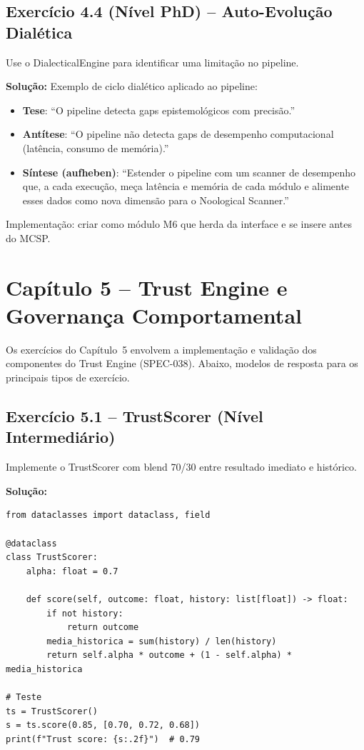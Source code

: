 \subsection*{Exercício 4.4 (Nível PhD) -- Auto-Evolução Dialética}
Use o DialecticalEngine para identificar uma limitação no pipeline.

\textbf{Solução:} Exemplo de ciclo dialético aplicado ao pipeline:

\begin{itemize}
\item \textbf{Tese}: ``O pipeline detecta gaps epistemológicos com precisão.''
\item \textbf{Antítese}: ``O pipeline não detecta gaps de desempenho
computacional (latência, consumo de memória).''
\item \textbf{Síntese (aufheben)}: ``Estender o pipeline com um scanner
de desempenho que, a cada execução, meça latência e memória de cada
módulo e alimente esses dados como nova dimensão para o Noological
Scanner.''
\end{itemize}

Implementação: criar  como módulo M6 que
herda da interface  e se insere antes do MCSP.

\section*{Capítulo 5 -- Trust Engine e Governança Comportamental}

Os exercícios do Capítulo~5 envolvem a implementação e validação dos
componentes do Trust Engine (SPEC-038). Abaixo, modelos de resposta
para os principais tipos de exercício.

\subsection*{Exercício 5.1 -- TrustScorer (Nível Intermediário)}
Implemente o TrustScorer com blend 70/30 entre resultado imediato e
histórico.

\textbf{Solução:}
\begin{lstlisting}[style=pythonstyle]
from dataclasses import dataclass, field

@dataclass
class TrustScorer:
    alpha: float = 0.7

    def score(self, outcome: float, history: list[float]) -> float:
        if not history:
            return outcome
        media_historica = sum(history) / len(history)
        return self.alpha * outcome + (1 - self.alpha) * media_historica

# Teste
ts = TrustScorer()
s = ts.score(0.85, [0.70, 0.72, 0.68])
print(f"Trust score: {s:.2f}")  # 0.79
\end{lstlisting}

